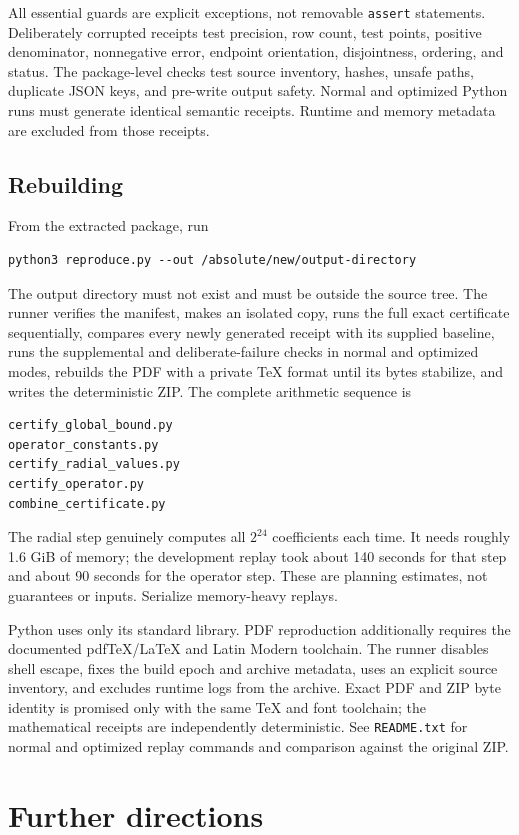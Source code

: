 \documentclass[11pt,letterpaper]{article}
\theoremstyle{remark}\newtheorem{remark}[theorem]{Remark}
\begin{document}
All essential guards are explicit exceptions, not removable \texttt{assert} statements. Deliberately corrupted receipts test precision, row count, test points, positive denominator, nonnegative error, endpoint orientation, disjointness, ordering, and status. The package-level checks test source inventory, hashes, unsafe paths, duplicate JSON keys, and pre-write output safety. Normal and optimized Python runs must generate identical semantic receipts. Runtime and memory metadata are excluded from those receipts.

\subsection{Rebuilding}
From the extracted package, run
\begin{verbatim}
python3 reproduce.py --out /absolute/new/output-directory
\end{verbatim}
The output directory must not exist and must be outside the source tree. The runner verifies the manifest, makes an isolated copy, runs the full exact certificate sequentially, compares every newly generated receipt with its supplied baseline, runs the supplemental and deliberate-failure checks in normal and optimized modes, rebuilds the PDF with a private TeX format until its bytes stabilize, and writes the deterministic ZIP. The complete arithmetic sequence is
\begin{verbatim}
certify_global_bound.py
operator_constants.py
certify_radial_values.py
certify_operator.py
combine_certificate.py
\end{verbatim}
The radial step genuinely computes all $2^{24}$ coefficients each time. It needs roughly 1.6 GiB of memory; the development replay took about 140 seconds for that step and about 90 seconds for the operator step. These are planning estimates, not guarantees or inputs. Serialize memory-heavy replays.

Python uses only its standard library. PDF reproduction additionally requires the documented pdfTeX/\LaTeX{} and Latin Modern toolchain. The runner disables shell escape, fixes the build epoch and archive metadata, uses an explicit source inventory, and excludes runtime logs from the archive. Exact PDF and ZIP byte identity is promised only with the same TeX and font toolchain; the mathematical receipts are independently deterministic. See \texttt{README.txt} for normal and optimized replay commands and comparison against the original ZIP.

\section{Further directions}\label{urt:sec:future}
\end{document}
